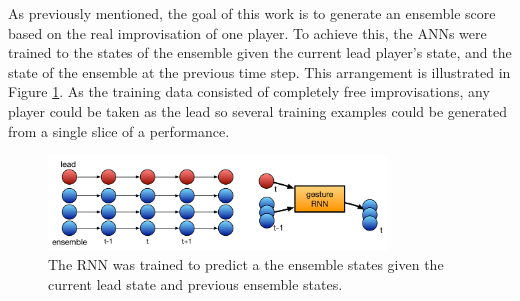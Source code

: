 \documentclass{article}
\begin{document}
As previously mentioned, the goal of this work is to generate an
ensemble score based on the real improvisation of one player. To
achieve this, the ANNs were trained to the states of the ensemble
given the current lead player's state, and the state of the ensemble
at the previous time step. This arrangement is illustrated in Figure
\ref{fig:nn-ensemble-training}. As the training data consisted of
completely free improvisations, any player could be taken as the lead
so several training examples could be generated from a single slice of
a performance.

\begin{figure}
  \centering
  \includegraphics[width=0.8\textwidth]{nn-ensemble-training}
  \caption{The RNN was trained to predict a the ensemble states given
    the current lead state and previous ensemble
    states.}\label{fig:nn-ensemble-training}
\end{figure}


 

\end{document}
